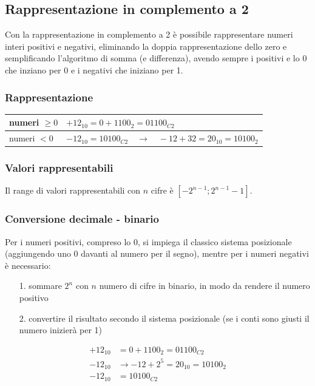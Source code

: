 \documentclass[a4paper]{article}
\begin{document}
\newpage


\subsection{Rappresentazione in complemento a 2}
Con la rappresentazione in complemento a 2 è possibile rappresentare numeri interi positivi e negativi, eliminando la
doppia rappresentazione dello zero e semplificando l'algoritmo di somma (e differenza), avendo sempre i positivi e lo
0 che inziano per 0 e i negativi che iniziano per 1.

\subsubsection*{Rappresentazione}
\begin{center}
	\begin{tabularx}{\textwidth}{l X}
		numeri \(\geq 0\) & \(+12_{10} = 0 + 1100_2 = 01100_{C2}\) \\
		\midrule
		numeri \(< 0\) & \(-12_{10} = 10100_{C2} \quad \rightarrow \quad -12 + 32 = 20_{10} = 10100_{2}\)
	\end{tabularx}
\end{center}

\subsubsection*{Valori rappresentabili}
Il range di valori rappresentabili con \(n\) cifre è \(\left[ - 2^{n - 1}; 2^{n - 1} - 1 \right]\).

\subsubsection*{Conversione decimale - binario}
Per i numeri positivi, compreso lo 0, si impiega il classico sistema posizionale (aggiungendo uno 0 davanti al
numero per il segno), mentre per i numeri negativi è necessario:
\begin{itemize}[topsep=3pt, itemsep=0pt]
	\item[1.] sommare \(2^n\) con \(n\) numero di cifre in binario, in modo da rendere il numero positivo
	\item[2.] convertire il risultato secondo il sistema posizionale (se i conti sono giusti il numero inizierà per 1)
\end{itemize}
\begin{align*}
	+12_{10} &= 0 + 1100_2 = 01100_{C2} \\
	-12_{10} &\rightarrow -12 + 2^5 = 20_{10} = 10100_{2} \\
	-12_{10} &= 10100_{C2}
\end{align*}
\end{document}
